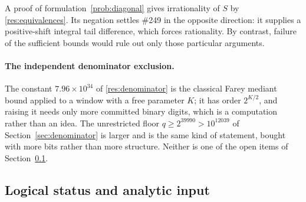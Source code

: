 \documentclass[11pt]{article}
\newcommand{\Stot}{S}
\begin{document}
A proof of formulation~\ref{prob:diagonal} gives irrationality of $\Stot$ by
\ref{res:equivalences}.  Its negation settles \#249 in the opposite direction:
it supplies a positive-shift integral tail difference, which forces
rationality.  By contrast, failure of the sufficient bounds would rule out
only those particular arguments.

\paragraph{The independent denominator exclusion.}
The constant $7.96\times10^{34}$ of \ref{res:denominator} is the classical
Farey mediant bound applied to a window with a free parameter $K$; it has
order $2^{K/2}$, and raising it needs only more committed binary digits, which
is a computation rather than an idea.  The unrestricted floor
$q\ge2^{39990}>10^{12039}$ of Section~\ref{sec:denominator} is larger and is
the same kind of statement, bought with more bits rather than more structure.
Neither is one of the open items of Section~\ref{sec:open}.

\subsection{Logical status and analytic input}\label{sec:open}
\end{document}
